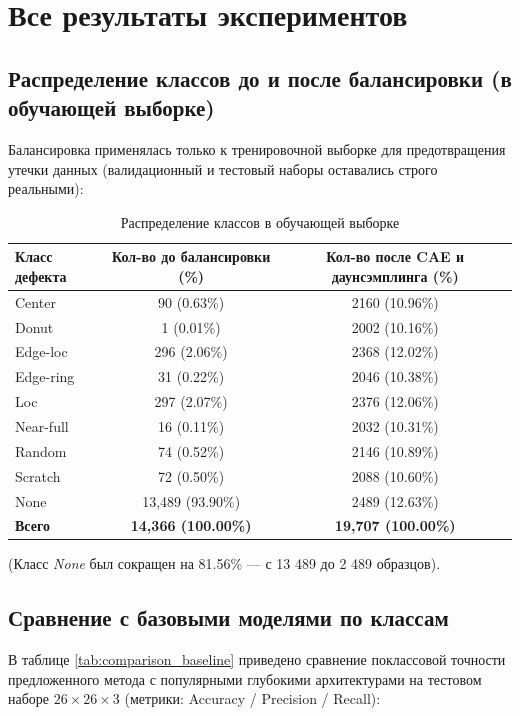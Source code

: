 \documentclass[11pt,a4paper]{article}
\begin{document}
\section{Все результаты экспериментов}

\subsection{Распределение классов до и после балансировки (в обучающей выборке)}
Балансировка применялась только к тренировочной выборке для предотвращения утечки данных (валидационный и тестовый наборы оставались строго реальными):

\begin{table}[h!]
\centering
\caption{Распределение классов в обучающей выборке}
\label{tab:class_distribution}
\begin{tabular}{lcc}
\toprule
\textbf{Класс дефекта} & \textbf{Кол-во до балансировки (\%)} & \textbf{Кол-во после CAE и даунсэмплинга (\%)} \\
\midrule
Center & 90 (0.63\%) & 2160 (10.96\%) \\
Donut & 1 (0.01\%) & 2002 (10.16\%) \\
Edge-loc & 296 (2.06\%) & 2368 (12.02\%) \\
Edge-ring & 31 (0.22\%) & 2046 (10.38\%) \\
Loc & 297 (2.07\%) & 2376 (12.06\%) \\
Near-full & 16 (0.11\%) & 2032 (10.31\%) \\
Random & 74 (0.52\%) & 2146 (10.89\%) \\
Scratch & 72 (0.50\%) & 2088 (10.60\%) \\
None & 13,489 (93.90\%) & 2489 (12.63\%) \\
\midrule
\textbf{Всего} & \textbf{14,366 (100.00\%)} & \textbf{19,707 (100.00\%)} \\
\bottomrule
\end{tabular}
\end{table}

\noindent (Класс \textit{None} был сокращен на 81.56\% — с 13 489 до 2 489 образцов).

\subsection{Сравнение с базовыми моделями по классам}
В таблице \ref{tab:comparison_baseline} приведено сравнение поклассовой точности предложенного метода с популярными глубокими архитектурами на тестовом наборе $26 \times 26 \times 3$ (метрики: Accuracy / Precision / Recall):
\end{document}
